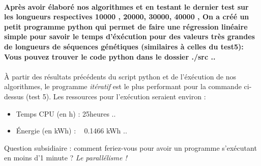 \documentclass[10pt,a4paper]{article}
\begin{document}
\\ \textbf{Après avoir élaboré nos algorithmes et en testant le dernier test sur les longueurs respectives 10000 , 20000, 30000, 40000 , On a créé un petit programme python
qui permet de faire une régression linéaire simple pour savoir le temps d'éxécution pour des valeurs très grandes de longueurs de séquences génétiques (similaires à celles du test5): Vous pouvez trouver
le code python dans le dossier ./src .. } \\
\\ À partir des résultats précédents du script python et de l'éxécution de nos algorithmes, le programme \emph{itératif} est le plus performant pour la commande ci-dessus (test 5). Les ressources pour l'exécution seraient environ :
\begin{itemize}
    \item Temps CPU (en h) : 25heures .. 
    \item Énergie (en kWh) : ~ 0.1466 kWh ..  
\end{itemize}

Question subsidiaire : comment feriez-vous pour avoir un programme s'exécutant en moins d'1 minute ?
\emph{Le parallélisme ! }
\end{document}
